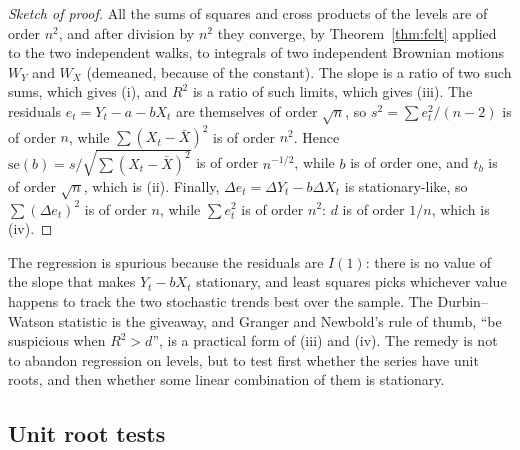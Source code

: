 \documentclass[11pt,a4paper]{article}
\numberwithin{equation}{section}
\theoremstyle{definition}
\begin{document}
\begin{proof}[Sketch of proof]
All the sums of squares and cross products of the levels are of order $n^2$, and after division by $n^2$ they converge, by Theorem~\ref{thm:fclt} applied to the two
independent walks, to integrals of two independent Brownian motions $W_Y$ and $W_X$ (demeaned, because of the constant). The slope is a ratio of two
such sums, which gives (i), and $R^2$ is a ratio of such limits, which gives (iii). The residuals $e_t = Y_t - a - bX_t$ are themselves of order $\sqrt n$, so
$s^2 = \sum e_t^2/(n - 2)$ is of order $n$, while $\sum(X_t - \bar X)^2$ is of order $n^2$. Hence $\text{se}(b) = s/\sqrt{\sum(X_t - \bar X)^2}$ is of order $n^{-1/2}$, while $b$ is of order one, and
$t_b$ is of order $\sqrt n$, which is (ii). Finally, $\Delta e_t = \Delta Y_t - b\Delta X_t$ is stationary-like, so $\sum(\Delta e_t)^2$ is of order $n$, while $\sum e_t^2$ is of order $n^2$:
$d$ is of order $1/n$, which is (iv).
\end{proof}

The regression is spurious because the residuals are $I(1)$: there is no value of the slope that makes $Y_t - bX_t$ stationary, and least squares picks
whichever value happens to track the two stochastic trends best over the sample. The Durbin--Watson statistic is the giveaway, and Granger and
Newbold's rule of thumb, ``be suspicious when $R^2 > d$'', is a practical form of (iii) and (iv). The remedy is not to abandon regression on levels, but to
test first whether the series have unit roots, and then whether some linear combination of them is stationary.

\subsection{Unit root tests}
\label{ssec:urtests}
\end{document}
